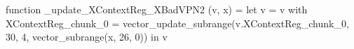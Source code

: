 function _update_XContextReg_XBadVPN2 (v, x) = let v = { v with XContextReg_chunk_0 = vector_update_subrange(v.XContextReg_chunk_0, 30, 4, vector_subrange(x, 26, 0)) } in v
